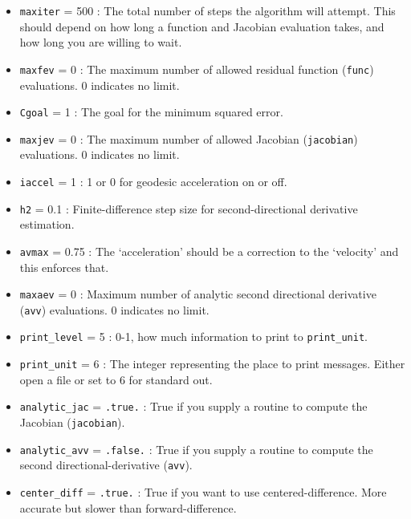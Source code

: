 \documentclass[12pt,pdf,singlespace]{article}
\begin{document}
\begin{itemize}
	\item \texttt{maxiter} = 500 : The total number of steps the algorithm will attempt. This should depend on how long a function and Jacobian evaluation takes, and how long you are willing to wait.
	\item \texttt{maxfev} = 0 : The maximum number of allowed residual function (\texttt{func}) evaluations. 0 indicates no limit.
	\item \texttt{Cgoal} = 1 : The goal for the minimum squared error.
	\item \texttt{maxjev} = 0 : The maximum number of allowed Jacobian (\texttt{jacobian}) evaluations. 0 indicates no limit.
\end{itemize}


\begin{itemize}
	\item \texttt{iaccel} = 1 : 1 or 0 for geodesic acceleration on or off.
	\item \texttt{h2} = 0.1 :  Finite-difference step size for second-directional derivative estimation.
	\item \texttt{avmax} = 0.75 : The `acceleration' should be a correction to the `velocity' and this enforces that.
	\item \texttt{maxaev} = 0 : Maximum number of analytic second directional derivative (\texttt{avv}) evaluations. 0 indicates no limit.
\end{itemize}


\begin{itemize}

\item \texttt{print\_level} = 5 : 0-1, how much information to print to \texttt{print\_unit}.
\item \texttt{print\_unit} = 6 : The integer representing the place to print messages. Either open a file or set to 6 for standard out.

\item \texttt{analytic\_jac} = \texttt{.true.} : True if you supply a routine to compute the Jacobian (\texttt{jacobian}).
\item \texttt{analytic\_avv} = \texttt{.false.} : True if you supply a routine to compute the second directional-derivative (\texttt{avv}).
\item \texttt{center\_diff} = \texttt{.true.} : True if you want to use centered-difference. More accurate but slower than forward-difference.

\end{itemize}
\end{document}
